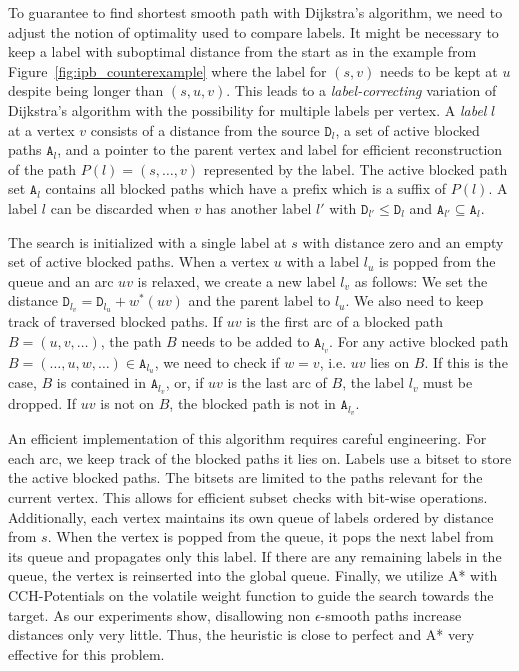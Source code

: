 \documentclass[a4paper,UKenglish,cleveref, autoref, thm-restate]{lipics-v2021}
\begin{document}
To guarantee to find shortest smooth path with Dijkstra's algorithm, we need to adjust the notion of optimality used to compare labels.
It might be necessary to keep a label with suboptimal distance from the start as in the example from Figure~\ref{fig:ipb_counterexample} where the label for $(s,v)$ needs to be kept at $u$ despite being longer than $(s,u,v)$.
This leads to a \emph{label-correcting} variation of Dijkstra's algorithm with the possibility for multiple labels per vertex.
A \emph{label} $l$ at a vertex $v$ consists of a distance from the source $\mathtt{D}_l$, a set of active blocked paths $\mathtt{A}_l$, and a pointer to the parent vertex and label for efficient reconstruction of the path $P(l) = (s,\dots,v)$ represented by the label.
The active blocked path set $\mathtt{A}_l$ contains all blocked paths which have a prefix which is a suffix of $P(l)$.
A label $l$ can be discarded when $v$ has another label $l'$ with $\mathtt{D}_{l'} \leq \mathtt{D}_l$ and $\mathtt{A}_{l'} \subseteq \mathtt{A}_l$.

The search is initialized with a single label at $s$ with distance zero and an empty set of active blocked paths.
When a vertex $u$ with a label $l_u$ is popped from the queue and an arc $uv$ is relaxed, we create a new label $l_v$ as follows:
We set the distance $\mathtt{D}_{l_v} = \mathtt{D}_{l_u} + w^*(uv)$ and the parent label to $l_u$.
We also need to keep track of traversed blocked paths.
If $uv$ is the first arc of a blocked path $B = (u,v,\dots)$, the path $B$ needs to be added to $\mathtt{A}_{l_v}$.
For any active blocked path $B = (\dots, u, w, \dots) \in \mathtt{A}_{l_u}$, we need to check if $w=v$, i.e. $uv$ lies on $B$.
If this is the case, $B$ is contained in $\mathtt{A}_{l_v}$, or, if $uv$ is the last arc of $B$, the label $l_v$ must be dropped.
If $uv$ is not on $B$, the blocked path is not in $\mathtt{A}_{l_v}$.

An efficient implementation of this algorithm requires careful engineering.
For each arc, we keep track of the blocked paths it lies on.
Labels use a bitset to store the active blocked paths.
The bitsets are limited to the paths relevant for the current vertex.
This allows for efficient subset checks with bit-wise operations.
Additionally, each vertex maintains its own queue of labels ordered by distance from $s$.
When the vertex is popped from the queue, it pops the next label from its queue and propagates only this label.
If there are any remaining labels in the queue, the vertex is reinserted into the global queue.
Finally, we utilize A* with CCH-Potentials on the volatile weight function to guide the search towards the target.
As our experiments show, disallowing non $\epsilon$-smooth paths increase distances only very little.
Thus, the heuristic is close to perfect and A* very effective for this problem.
\end{document}
